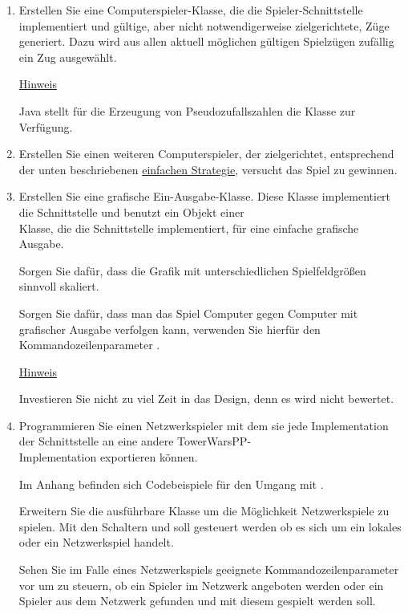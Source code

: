 \begin{enumerate}
\item Erstellen Sie eine Computerspieler-Klasse, die die Spieler-Schnittstelle implementiert und gültige, aber nicht notwendigerweise zielgerichtete, Züge generiert. Dazu wird aus allen aktuell möglichen gültigen Spielzügen zufällig ein Zug ausgewählt.

\underline{Hinweis}

Java stellt für die Erzeugung von Pseudozufallszahlen die Klasse  zur Verfügung.

\item Erstellen Sie einen weiteren Computerspieler, der zielgerichtet, entsprechend der unten beschriebenen \hyperlink{strategy}{einfachen Strategie}, versucht das Spiel zu gewinnen.

\item Erstellen Sie eine grafische Ein-Ausgabe-Klasse. Diese Klasse implementiert die Schnittstelle  und benutzt ein Objekt einer \\Klasse, die die Schnittstelle  implementiert, für eine einfache grafische Ausgabe.
\newpage

Sorgen Sie dafür, dass die Grafik mit unterschiedlichen Spielfeldgrößen sinnvoll skaliert.

Sorgen Sie dafür, dass man das Spiel Computer gegen Computer mit grafischer Ausgabe verfolgen kann, verwenden Sie hierfür den Kommandozeilenparameter .

\underline{Hinweis}

Investieren Sie nicht zu viel Zeit in das Design, denn es wird nicht bewertet.

\item Programmieren Sie einen Netzwerkspieler mit dem sie jede Implementation der Schnittstelle  an eine andere TowerWarsPP- \\Implementation exportieren können.

Im Anhang befinden sich Codebeispiele für den Umgang mit .

Erweitern Sie die ausführbare Klasse um die Möglichkeit Netzwerkspiele zu spielen. Mit den Schaltern  und  soll gesteuert werden ob es sich um ein lokales oder ein Netzwerkspiel handelt. 

Sehen Sie im Falle eines Netzwerkspiels geeignete Kommandozeilenparameter vor um zu steuern, ob ein Spieler im Netzwerk angeboten werden oder ein Spieler aus dem Netzwerk gefunden und mit diesem gespielt werden soll.


\end{enumerate}
